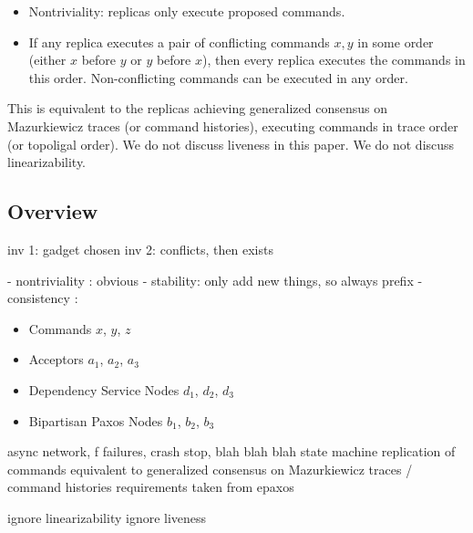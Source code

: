 \begin{itemize}
  \item Nontriviality: replicas only execute proposed commands.
  \item If any replica executes a pair of conflicting commands $x, y$ in some order (either $x$ before $y$ or $y$ before $x$), then every replica executes the commands in this order. Non-conflicting commands can be executed in any order.
\end{itemize}

This is equivalent to the replicas achieving generalized consensus on
Mazurkiewicz traces (or command histories), executing commands in trace order
(or topoligal order). We do not discuss liveness in this paper. We do not discuss linearizability.

\subsection{Overview}

inv 1: gadget chosen
inv 2: conflicts, then exists


- nontriviality : obvious
- stability: only add new things, so always prefix
- consistency :

\begin{itemize}
  \item Commands $x$, $y$, $z$
  \item Acceptors $a_1$, $a_2$, $a_3$
  \item Dependency Service Nodes $d_1$, $d_2$, $d_3$
  \item Bipartisan Paxos Nodes $b_1$, $b_2$, $b_3$
\end{itemize}



async network, f failures, crash stop, blah blah blah
state machine replication of commands
equivalent to generalized consensus on Mazurkiewicz traces / command histories
requirements taken from epaxos

ignore linearizability
ignore liveness

